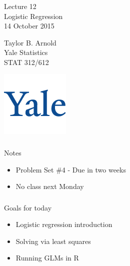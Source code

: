   



\begin{frame}[fragile] \frametitle{}

\vfill

{\fontsize{0.7cm}{0cm}\selectfont Lecture 12 \\\vspace{0.2cm}
Logistic Regression}\\\vspace{0.5cm}
14 October 2015

\vspace{2cm}

\begin{minipage}{0.6\textwidth}
Taylor B. Arnold \\
Yale Statistics \\
STAT 312/612
\end{minipage}
\hfill
\begin{minipage}{0.3\textwidth}\raggedleft
\includegraphics[scale=0.3]{../yale-logo.png}
\end{minipage}%

\end{frame}

\begin{frame}[fragile] \frametitle{}

{\color{yaleblue}\fontsize{16pt}{20pt}\selectfont Notes}

\begin{itemize}
\item Problem Set \#4 - Due in two weeks
\item No class next Monday
\end{itemize}

\end{frame}

\begin{frame}[fragile] \frametitle{}

{\color{yaleblue}\fontsize{16pt}{20pt}\selectfont Goals for today}

\begin{itemize}
\item Logistic regression introduction
\item Solving via least squares
\item Running GLMs in R
\end{itemize}

\end{frame}

